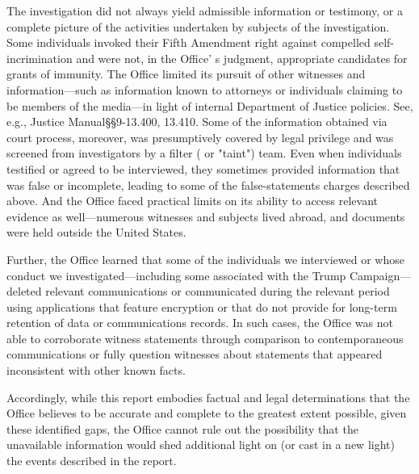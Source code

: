 The investigation did not always yield admissible information or testimony, or a complete picture of the activities undertaken by subjects of the investigation.
Some individuals invoked their Fifth Amendment right against compelled self-incrimination and were not, in the Office' s judgment, appropriate candidates for grants of immunity.
The Office limited its pursuit of other witnesses and information---such as information known to attorneys or individuals claiming to be members of the media---in light of internal Department of Justice policies.
See, e.g., Justice Manual\S\S 9-13.400, 13.410. Some of the information obtained via court process, moreover, was presumptively covered by legal privilege and was screened from investigators by a filter ( or "taint") team.
Even when individuals testified or agreed to be interviewed, they sometimes provided information that was false or incomplete, leading to some of the false-statements charges described above.
And the Office faced practical limits on its ability to access relevant evidence as well---numerous witnesses and subjects lived abroad, and documents were held outside the United States.

Further, the Office learned that some of the individuals we interviewed or whose conduct we investigated---including some associated with the Trump Campaign---deleted relevant communications or communicated during the relevant period using applications that feature encryption or that do not provide for long-term retention of data or communications records.
In such cases, the Office was not able to corroborate witness statements through comparison to contemporaneous communications or fully question witnesses about statements that appeared inconsistent with other known facts.

Accordingly, while this report embodies factual and legal determinations that the Office believes to be accurate and complete to the greatest extent possible, given these identified gaps, the Office cannot rule out the possibility that the unavailable information would shed additional light on (or cast in a new light) the events described in the report.

